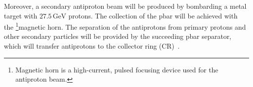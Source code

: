 Moreover, a secondary antiproton beam will be produced by bombarding a metal target with $27.5\,\mathrm{GeV}$ protons. The collection of the pbar will be achieved with the \footnote{Magnetic horn is a high-current, pulsed focusing device used for the antiproton beam.}{magnetic horn}. The separation of the antiprotons from primary protons
and other secondary particles will be provided by the succeeding pbar separator, which will transfer antiprotons to the collector ring (CR)~\cite{SI100_CR}.

